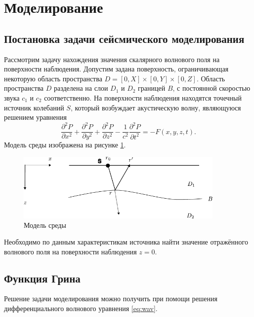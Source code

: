 \documentclass[a4paper, fontsize=14pt]{article}
\begin{document}
	
	\newpage
	\section{Моделирование} 
	\subsection{Постановка задачи сейсмического моделирования} 

	Рассмотрим задачу нахождения значения скалярного волнового поля на поверхности
	наблюдения.
	Допустим задана поверхность, ограничивающая некоторую область пространства
	$D=[0,X]\times [0,Y]\times [0,Z]$.
	Область пространства $D$ разделена на слои $D_1$ и $D_2$ границей $B$, с постоянной
	скоростью звука $c_1$ и $c_2$ соответственно.
	На поверхности наблюдения находятся точечный источник колебаний $S$, который возбуждает
	акустическую волну, являющуюся решением уравнения
	\begin{equation}
		\frac{\partial^2 P}{\partial x^2} + \frac{\partial^2 P}{\partial y^2} +
		\frac{\partial^2 P}{\partial z^2} - \frac{1}{c^2} \frac{\partial^2 P}{\partial
			t^2} = -F(x,y,z,t).
		\label{eq:wav}	
	\end{equation} 
	Модель среды изображена на рисунке \ref{fig:mig}.
	
	\begin{figure}[h]
		
		\centering
		\includegraphics[width=0.9\textwidth]{migration_fig.pdf}
		
		\caption{Модель среды}
		\label{fig:mig}
	\end{figure}
	Необходимо по данным характеристикам источника найти значение отражённого волнового поля
	на поверхности наблюдения $z=0$.
	


	\subsection{Функция Грина} 
		Решение задачи моделирования можно получить при помощи решения
	дифференциального волнового уравнения  \eqref{eq:wav}.
\end{document}
